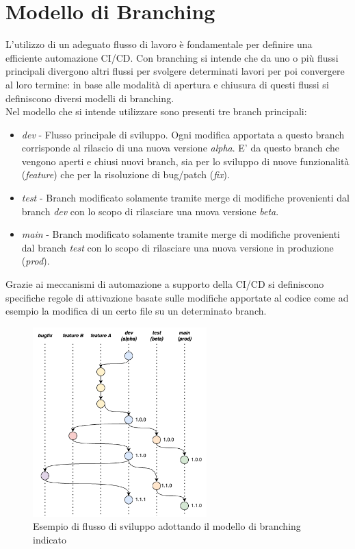\section{Modello di Branching}
L'utilizzo di un adeguato flusso di lavoro è fondamentale per definire una efficiente automazione CI/CD. Con branching si intende che da uno o più flussi principali divergono altri flussi per svolgere determinati lavori per poi convergere al loro termine: in base alle modalità di apertura e chiusura di questi flussi si definiscono diversi modelli di branching.\\
Nel modello che si intende utilizzare sono presenti tre branch principali:
\begin{itemize}
    \item \textit{dev} - Flusso principale di sviluppo. Ogni modifica apportata a questo branch corrisponde al rilascio di una nuova versione \textit{alpha}. E' da questo branch che vengono aperti e chiusi nuovi branch, sia per lo sviluppo di nuove funzionalità (\textit{feature}) che per la risoluzione di bug/patch (\textit{fix}).
    \item \textit{test} - Branch modificato solamente tramite merge di modifiche provenienti dal branch \textit{dev} con lo scopo di rilasciare una nuova versione \textit{beta}.
    \item \textit{main} - Branch modificato solamente tramite merge di modifiche provenienti dal branch \textit{test} con lo scopo di rilasciare una nuova versione in produzione (\textit{prod}).
\end{itemize}

Grazie ai meccanismi di automazione a supporto della CI/CD si definiscono specifiche regole di attivazione basate sulle modifiche apportate al codice come ad esempio la modifica di un certo file su un determinato branch.

\begin{figure}[H]
\centering
\includegraphics[width=0.6\textwidth]{img/tesi-13-branching.drawio.png}
\caption{Esempio di flusso di sviluppo adottando il modello di branching indicato}
\end{figure}


